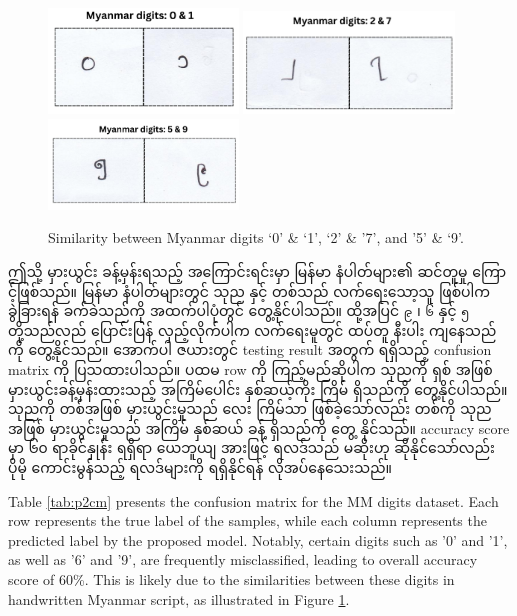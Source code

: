 \begin{figure}[h]
    \centering    
    \includegraphics[width=0.45\textwidth]{imgs/0and1.png}
    \includegraphics[width=0.5\textwidth]{imgs/2and7.png}
    \includegraphics[width=0.45\textwidth]{imgs/5and9.png}
    \caption{Similarity between Myanmar digits `0' \& `1',  `2' \& '7', and '5' \& `9'.}
    \label{fig:mm_digits_similarity}
\end{figure}

ဤသို့ မှားယွင်း ခန့်မှန်းရသည့် အကြောင်းရင်းမှာ မြန်မာ နံပါတ်များ၏ ဆင်တူမှု ကြောင့်ဖြစ်သည်။ မြန်မာ နံပါတ်များတွင် သုည နှင့် တစ်သည် လက်ရေးသော့သူ ဖြစ်ပါက ခွဲခြားရန် ခက်ခဲသည်ကို အထက်ပါပုံတွင် တွေ့နိုင်ပါသည်။ ထို့အပြင် \texttt{၉} ၊  \texttt{၆} နှင့် \texttt{၅} တို့သည်လည် ပြောင်းပြန် လှည့်လိုက်ပါက လက်ရေးမူတွင် ထပ်တူ နီးပါး ကျနေသည်ကို တွေ့နိုင်သည်။ အောက်ပါ ဇယားတွင် testing result အတွက် ရရှိသည့် confusion matrix ကို ပြသထားပါသည်။ ပထမ row ကို ကြည့်မည်ဆိုပါက သုညကို ရှစ် အဖြစ် မှားယွင်းခန့်မှန်းထားသည့် အကြိမ်ပေါင်း နှစ်ဆယ့်ကိုး ကြိမ် ရှိသည်ကို တွေ့နိုင်ပါသည်။ သုညကို တစ်အဖြစ် မှားယွင်းမှုသည် လေး ကြိမ်သာ ဖြစ်ခဲ့သော်လည်း တစ်ကို သုည အဖြစ် မှားယွင်းမှုသည် အကြိမ် နှစ်ဆယ် ခန့် ရှိသည်ကို တွေ့ နိုင်သည်။ accuracy score မှာ ၆၀ ရာခိုင်နှုန်း ရရှိရာ ယေဘူယျ အားဖြင့် ရလဒ်သည် မဆိုးဟု ဆိုနိုင်သော်လည်း ပိုမို ကောင်းမွန်သည့် ရလဒ်များကို ရရှိနိုင်ရန် လိုအပ်နေသေးသည်။ 

Table \ref{tab:p2cm} presents the confusion matrix for the MM digits dataset. Each row represents the true label of the samples, while each column represents the predicted label by the proposed model. Notably, certain digits such as '0' and '1', as well as '6' and '9', are frequently misclassified, leading to overall accuracy score of 60\%. This is likely due to the similarities between these digits in handwritten Myanmar script, as illustrated in Figure \ref{fig:mm_digits_similarity}. 

